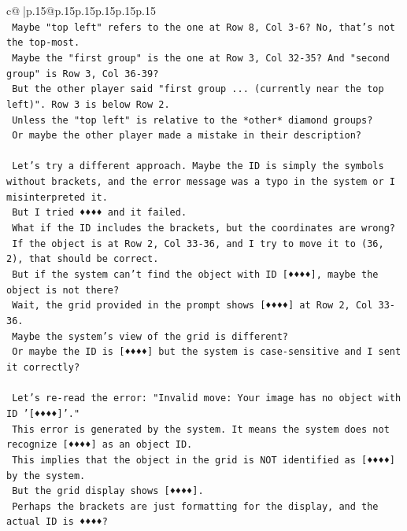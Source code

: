 \documentclass{article}
\begin{document}
{\begin{supertabular}{c@{$\;$}|p{.15\linewidth}@{}p{.15\linewidth}p{.15\linewidth}p{.15\linewidth}p{.15\linewidth}p{.15\linewidth}}
{{{\\ 
\texttt{    Maybe "top left" refers to the one at Row 8, Col 3{-}6? No, that's not the top{-}most.} \\
\texttt{    Maybe the "first group" is the one at Row 3, Col 32{-}35? And "second group" is Row 3, Col 36{-}39?} \\
\texttt{    But the other player said "first group ... (currently near the top left)". Row 3 is below Row 2.} \\
\texttt{    Unless the "top left" is relative to the *other* diamond groups?} \\
\texttt{    Or maybe the other player made a mistake in their description?} \\
\\ 
\texttt{    Let's try a different approach. Maybe the ID is simply the symbols without brackets, and the error message was a typo in the system or I misinterpreted it.} \\
\texttt{    But I tried ♦♦♦♦ and it failed.} \\
\texttt{    What if the ID includes the brackets, but the coordinates are wrong?} \\
\texttt{    If the object is at Row 2, Col 33{-}36, and I try to move it to (36, 2), that should be correct.} \\
\texttt{    But if the system can't find the object with ID {[}♦♦♦♦{]}, maybe the object is not there?} \\
\texttt{    Wait, the grid provided in the prompt shows {[}♦♦♦♦{]} at Row 2, Col 33{-}36.} \\
\texttt{    Maybe the system's view of the grid is different?} \\
\texttt{    Or maybe the ID is {[}♦♦♦♦{]} but the system is case{-}sensitive and I sent it correctly?} \\
\\ 
\texttt{    Let's re{-}read the error: "Invalid move: Your image has no object with ID '{[}♦♦♦♦{]}'."} \\
\texttt{    This error is generated by the system. It means the system does not recognize {[}♦♦♦♦{]} as an object ID.} \\
\texttt{    This implies that the object in the grid is NOT identified as {[}♦♦♦♦{]} by the system.} \\
\texttt{    But the grid display shows {[}♦♦♦♦{]}.} \\
\texttt{    Perhaps the brackets are just formatting for the display, and the actual ID is ♦♦♦♦?} \\
}}}
\end{supertabular}}
\end{document}
